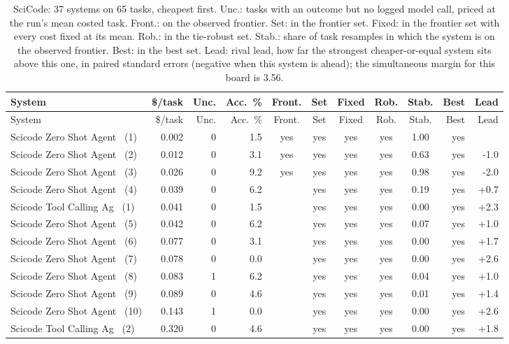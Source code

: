 {\begin{longtable}{lrrrcccccrr}
\caption{SciCode: 37 systems on 65 tasks, cheapest first. Unc.: tasks with an outcome but no logged model call, priced at the run's mean costed task. Front.: on the observed frontier. Set: in the frontier set. Fixed: in the frontier set with every cost fixed at its mean. Rob.: in the tie-robust set. Stab.: share of task resamples in which the system is on the observed frontier. Best: in the best set. Lead: rival lead, how far the strongest cheaper-or-equal system sits above this one, in paired standard errors (negative when this system is ahead); the simultaneous margin for this board is 3.56.}\label{tab:supp-hal_scicode}\\
\toprule
System & \$/task & Unc. & Acc.\ \% & Front. & Set & Fixed & Rob. & Stab. & Best & Lead \\
\midrule
\endfirsthead
\toprule
System & \$/task & Unc. & Acc.\ \% & Front. & Set & Fixed & Rob. & Stab. & Best & Lead \\
\midrule
\endhead
\bottomrule
\endfoot
Scicode Zero Shot Agent~ (1) & 0.002 & 0 & 1.5 & yes & yes & yes & yes & 1.00 & yes &  \\
Scicode Zero Shot Agent~ (2) & 0.012 & 0 & 3.1 & yes & yes & yes & yes & 0.63 & yes & -1.0 \\
Scicode Zero Shot Agent~ (3) & 0.026 & 0 & 9.2 & yes & yes & yes & yes & 0.98 & yes & -2.0 \\
Scicode Zero Shot Agent~ (4) & 0.039 & 0 & 6.2 &  & yes & yes & yes & 0.19 & yes & +0.7 \\
Scicode Tool Calling Ag~ (1) & 0.041 & 0 & 1.5 &  & yes & yes & yes & 0.00 & yes & +2.3 \\
Scicode Zero Shot Agent~ (5) & 0.042 & 0 & 6.2 &  & yes & yes & yes & 0.07 & yes & +1.0 \\
Scicode Zero Shot Agent~ (6) & 0.077 & 0 & 3.1 &  & yes & yes & yes & 0.00 & yes & +1.7 \\
Scicode Zero Shot Agent~ (7) & 0.078 & 0 & 0.0 &  & yes & yes & yes & 0.00 & yes & +2.6 \\
Scicode Zero Shot Agent~ (8) & 0.083 & 1 & 6.2 &  & yes & yes & yes & 0.04 & yes & +1.0 \\
Scicode Zero Shot Agent~ (9) & 0.089 & 0 & 4.6 &  & yes & yes & yes & 0.01 & yes & +1.4 \\
Scicode Zero Shot Agent~ (10) & 0.143 & 1 & 0.0 &  & yes & yes & yes & 0.00 & yes & +2.6 \\
Scicode Tool Calling Ag~ (2) & 0.320 & 0 & 4.6 &  & yes & yes & yes & 0.00 & yes & +1.8 \\

\end{longtable}}
